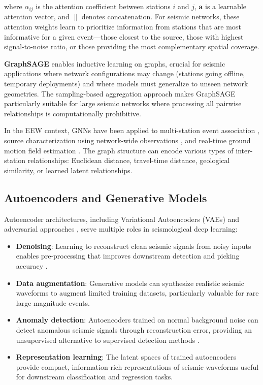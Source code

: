 \documentclass[review,authoryear]{elsarticle}
\begin{document}
\noindent where $\alpha_{ij}$ is the attention coefficient between stations $i$ and $j$, $\mathbf{a}$ is a learnable attention vector, and $\|$ denotes concatenation. For seismic networks, these attention weights learn to prioritize information from stations that are most informative for a given event---those closest to the source, those with highest signal-to-noise ratio, or those providing the most complementary spatial coverage.

\textbf{GraphSAGE} \citep{hamilton2017inductive} enables inductive learning on graphs, crucial for seismic applications where network configurations may change (stations going offline, temporary deployments) and where models must generalize to unseen network geometries. The sampling-based aggregation approach makes GraphSAGE particularly suitable for large seismic networks where processing all pairwise relationships is computationally prohibitive.

In the EEW context, GNNs have been applied to multi-station event association \citep{mcbrearty2023earthquake}, source characterization using network-wide observations \citep{vandenende2020deep}, and real-time ground motion field estimation \citep{bloemheuvel2022graph}. The graph structure can encode various types of inter-station relationships: Euclidean distance, travel-time distance, geological similarity, or learned latent relationships.

\subsection{Autoencoders and Generative Models}

Autoencoder architectures, including Variational Autoencoders (VAEs) \citep{kingma2014auto} and adversarial approaches \citep{goodfellow2014generative}, serve multiple roles in seismological deep learning:

\begin{itemize}
\item \textbf{Denoising}: Learning to reconstruct clean seismic signals from noisy inputs enables pre-processing that improves downstream detection and picking accuracy \citep{zhu2021seismic, van2019deep}.
\item \textbf{Data augmentation}: Generative models can synthesize realistic seismic waveforms to augment limited training datasets, particularly valuable for rare large-magnitude events.
\item \textbf{Anomaly detection}: Autoencoders trained on normal background noise can detect anomalous seismic signals through reconstruction error, providing an unsupervised alternative to supervised detection methods \citep{mousavi2020unsupervised, seydoux2020clustering}.
\item \textbf{Representation learning}: The latent spaces of trained autoencoders provide compact, information-rich representations of seismic waveforms useful for downstream classification and regression tasks.
\end{itemize}
\end{document}
